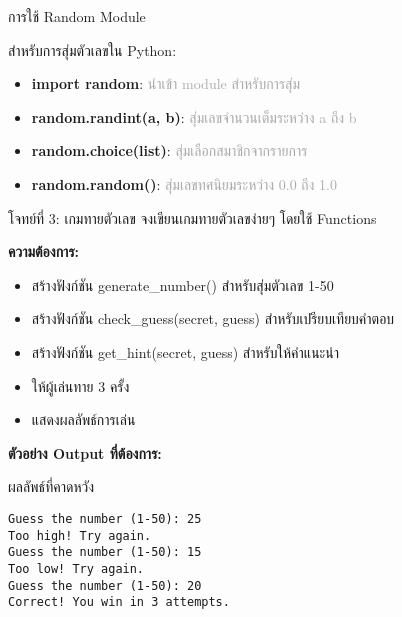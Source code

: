 \documentclass[12pt,a4paper]{article}
\newcommand{\textlight}[1]{{\thailightfont #1}}
\begin{document}
\vspace{6cm}

\begin{noticebox}{การใช้ Random Module}

\textlight{สำหรับการสุ่มตัวเลขใน Python:}

\begin{itemize}
    \item \textbf{import random}: \textcolor{darkgray}{นำเข้า module สำหรับการสุ่ม}
    \item \textbf{random.randint(a, b)}: \textcolor{darkgray}{สุ่มเลขจำนวนเต็มระหว่าง a ถึง b}
    \item \textbf{random.choice(list)}: \textcolor{darkgray}{สุ่มเลือกสมาชิกจากรายการ}
    \item \textbf{random.random()}: \textcolor{darkgray}{สุ่มเลขทศนิยมระหว่าง 0.0 ถึง 1.0}
\end{itemize}

\end{noticebox}

\begin{exercisebox}{โจทย์ที่ 3: เกมทายตัวเลข}
\textlight{จงเขียนเกมทายตัวเลขง่ายๆ โดยใช้ Functions}

\textlight{\textbf{ความต้องการ:}}
\begin{itemize}
    \item \textlight{สร้างฟังก์ชัน generate\_number() สำหรับสุ่มตัวเลข 1-50}
    \item \textlight{สร้างฟังก์ชัน check\_guess(secret, guess) สำหรับเปรียบเทียบคำตอบ}
    \item \textlight{สร้างฟังก์ชัน get\_hint(secret, guess) สำหรับให้คำแนะนำ}
    \item \textlight{ให้ผู้เล่นทาย 3 ครั้ง}
    \item \textlight{แสดงผลลัพธ์การเล่น}
\end{itemize}

\textlight{\textbf{ตัวอย่าง Output ที่ต้องการ:}}
\begin{codebox}{ผลลัพธ์ที่คาดหวัง}
\begin{lstlisting}[style=python]
Guess the number (1-50): 25
Too high! Try again.
Guess the number (1-50): 15
Too low! Try again.
Guess the number (1-50): 20
Correct! You win in 3 attempts.
\end{lstlisting}
\end{codebox}

\end{exercisebox}

\vspace{9cm}
\end{document}

